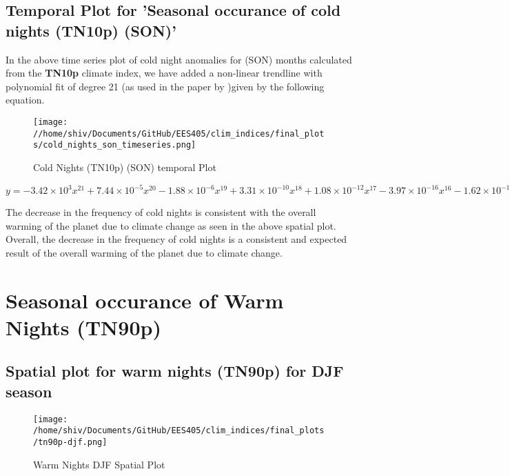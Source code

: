 \documentclass[a4paper, 12pt, twoside]{report}
\begin{document}
\subsection{Temporal Plot for 'Seasonal occurance of cold nights (TN10p) (SON)'}
In the above time series plot of cold night anomalies for (SON) months calculated from the \textbf{TN10p} climate index, we have added a non-linear trendline with polynomial fit of degree 21 (as used in the paper by )given by the following equation.
\begin{figure}[htb]
    \centering
    \texttt{[image: //home/shiv/Documents/GitHub/EES405/clim\_indices/final\_plots/cold\_nights\_son\_timeseries.png]}
    \caption{Cold Nights (TN10p) (SON) temporal Plot}
    \label{fig:tn10p_son_temporal}
\end{figure}

$ y = -3.42\times10^{3}x^{21}+7.44\times10^{-5}x^{20}-1.88\times10^{-6}x^{19}+3.31\times10^{-10}x^{18}+1.08\times10^{-12}x^{17}-3.97\times10^{-16}x^{16}-1.62\times10^{-19}x^{15}+1.05\times10^{-22}x^{14}-5.80\times10^{-27}x^{13}-8.00\times10^{-30}x^{12}+2.29\times10^{-33}x^{11}-1.20\times10^{-37}x^{10}-6.72\times10^{-41}x^{9}+1.99\times10^{-44}x^{8}-2.95\times10^{-48}x^{7}+2.85\times10^{-52}x^{6}-1.92\times10^{-56}x^{5}+9.12\times10^{-61}x^{4}-3.03\times10^{-65}x^{3}+6.69\times10^{-70}x^{2}-8.87\times10^{-75}x+5.34\times10^{-80}$

The decrease in the frequency of cold nights is consistent with the overall warming of the planet due to climate change as seen in the above spatial plot.\\
Overall, the decrease in the frequency of cold nights is a consistent and expected result of the overall warming of the planet due to climate change.

\section{Seasonal occurance of Warm Nights (TN90p)}
\newpage
\subsection{Spatial plot for warm nights (TN90p) for DJF season}
\begin{figure}[htb]
    \centering
    \texttt{[image: /home/shiv/Documents/GitHub/EES405/clim\_indices/final\_plots/tn90p-djf.png]}
    \caption{Warm Nights DJF Spatial Plot}
    \label{fig:tn90p_djf_spatial}
\end{figure}
\end{document}
